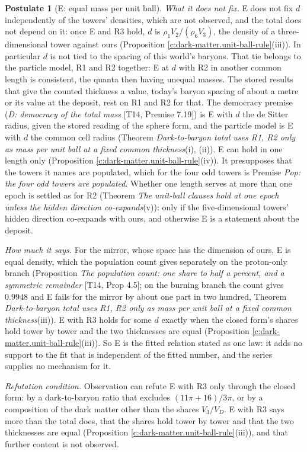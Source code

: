 \documentclass[11pt]{article}
\theoremstyle{definition}
\newtheorem{postulate}[theorem]{Postulate}
\theoremstyle{plain}
\begin{document}
\begin{postulate}[E: equal mass per unit ball]
\emph{What it does not fix.} E does not fix $d$ independently of the towers' densities, which are not observed, and the total does not depend on it: once E and R3 hold, $d$ is $\rho_{1}V_{2}/(\rho_{6}V_{3})$, the density of a three-dimensional tower against ours (Proposition \ref{c:dark-matter.unit-ball-rule}(iii)). In particular $d$ is not tied to the spacing of this world's baryons. That tie belongs to the particle model, R1 and R2 together: E at $d$ with R2 in another common length is consistent, the quanta then having unequal masses. The stored results that give the counted thickness a value, today's baryon spacing of about a metre or its value at the deposit, rest on R1 and R2 for that. The democracy premise (\emph{D: democracy of the total mass} [T14, Premise 7.19]) is E with $d$ the de Sitter radius, given the stored reading of the sphere form, and the particle model is E with $d$ the common cell radius (Theorem \emph{Dark-to-baryon total uses R1, R2 only as mass per unit ball at a fixed common thickness}(i), (ii)). E can hold in one length only (Proposition \ref{c:dark-matter.unit-ball-rule}(iv)). It presupposes that the towers it names are populated, which for the four odd towers is Premise \emph{Pop: the four odd towers are populated}. Whether one length serves at more than one epoch is settled as for R2 (Theorem \emph{The unit-ball clauses hold at one epoch unless the hidden direction co-expands}(v)): only if the five-dimensional towers' hidden direction co-expands with ours, and otherwise E is a statement about the deposit.

\emph{How much it says.} For the mirror, whose space has the dimension of ours, E is equal density, which the population count gives separately on the proton-only branch (Proposition \emph{The population count: one share to half a percent, and a symmetric remainder} [T14, Prop 4.5]; on the burning branch the count gives $0.9948$ and E fails for the mirror by about one part in two hundred, Theorem \emph{Dark-to-baryon total uses R1, R2 only as mass per unit ball at a fixed common thickness}(iii)). E with R3 holds for some $d$ exactly when the closed form's shares hold tower by tower and the two thicknesses are equal (Proposition \ref{c:dark-matter.unit-ball-rule}(iii)). So E is the fitted relation stated as one law: it adds no support to the fit that is independent of the fitted number, and the series supplies no mechanism for it.

\emph{Refutation condition.} Observation can refute E with R3 only through the closed form: by a dark-to-baryon ratio that excludes $(11\pi + 16)/3\pi$, or by a composition of the dark matter other than the shares $V_{3}/V_{D}$. E with R3 says more than the total does, that the shares hold tower by tower and that the two thicknesses are equal (Proposition \ref{c:dark-matter.unit-ball-rule}(iii)), and that further content is not observed.
\end{postulate}
\end{document}

